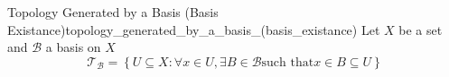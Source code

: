 \begin{definition}
{Topology Generated by a Basis (Basis
    Existance)}{topology_generated_by_a_basis_(basis_existance)}
    Let \(X\) be a set and \(\mathcal{B}\) a basis on \(X\)
    \[
    \mathcal{T}_{\mathcal{B}} = \left\{U \subseteq X: \forall x \in U, \exists B \in
    \mathcal{B} \text{such that} x \in B \subseteq U \right\}
    \]
\end{definition}
